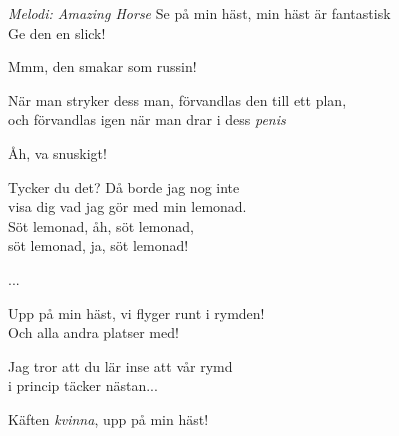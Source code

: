 {\footnotesize\textit{Melodi: Amazing Horse}}
\vspace{10pt}
Se på min häst, min häst är fantastisk\\
Ge den en slick!\par
\vspace{10pt}
Mmm, den smakar som russin!\par
\vspace{10pt}
När man stryker dess man, förvandlas den till ett plan,\\
och förvandlas igen när man drar i dess \textit{penis}\par
\vspace{10pt}
Åh, va snuskigt!\par
\vspace{10pt}
Tycker du det? Då borde jag nog inte\\
visa dig vad jag gör med min lemonad.\\
Söt lemonad, åh, söt lemonad,\\
söt lemonad, ja, söt lemonad!\par
\vspace{10pt}
...\par
\vspace{10pt}
Upp på min häst, vi flyger runt i rymden!\\
Och alla andra platser med!\par
\vspace{10pt}
Jag tror att du lär inse att vår rymd\\
i princip täcker nästan...\par
\vspace{10pt}
Käften \textit{kvinna}, upp på min häst!
